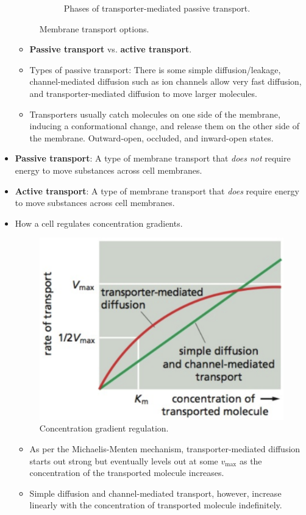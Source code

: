 \documentclass[../notes.tex]{subfiles}
\begin{document}
\begin{itemize}
\begin{figure}[h!]
\begin{subfigure}[b]{0.49\linewidth}
            \caption{Phases of transporter-mediated passive transport.}
            \label{fig:transportTypesb}
        \end{subfigure}
        \caption{Membrane transport options.}
        \label{fig:transportTypes}
    \end{figure}
    \begin{itemize}
        \item \textbf{Passive transport} vs. \textbf{active transport}.
        \item Types of passive transport: There is some simple diffusion/leakage, channel-mediated diffusion such as ion channels allow very fast diffusion, and transporter-mediated diffusion to move larger molecules.
        \item Transporters usually catch molecules on one side of the membrane, inducing a conformational change, and release them on the other side of the membrane. Outward-open, occluded, and inward-open states.
    \end{itemize}
    \item \textbf{Passive transport}: A type of membrane transport that \emph{does not} require energy to move substances across cell membranes.
    \item \textbf{Active transport}: A type of membrane transport that \emph{does} require energy to move substances across cell membranes.
    \item How a cell regulates concentration gradients.
    \begin{figure}[h!]
        \centering
        \includegraphics[width=0.33\linewidth]{../ExtFiles/concentrationGradientRegulation.png}
        \caption{Concentration gradient regulation.}
        \label{fig:concentrationGradientRegulation}
    \end{figure}
    \begin{itemize}
        \item As per the Michaelis-Menten mechanism, transporter-mediated diffusion starts out strong but eventually levels out at some $v_\text{max}$ as the concentration of the transported molecule increases.
        \item Simple diffusion and channel-mediated transport, however, increase linearly with the concentration of transported molecule indefinitely.

\end{itemize}
\end{itemize}
\end{document}
